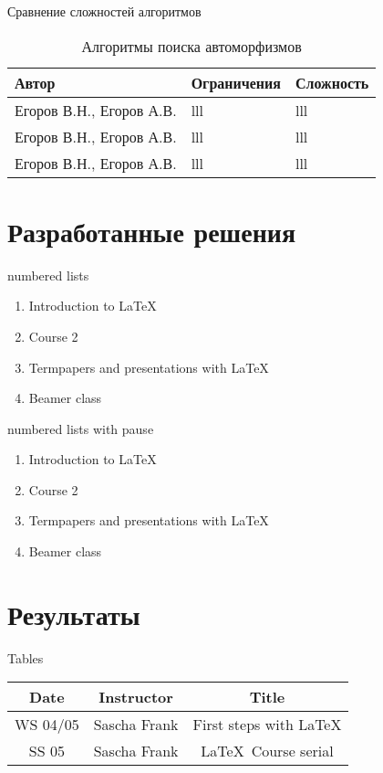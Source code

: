 \documentclass{beamer}
\begin{document}
\begin{frame}{Сравнение сложностей алгоритмов}

\begin{table}[h]
\centering
\begin{tabular}[t]{|l|l|l|}
\hline
\textbf{Автор} & \textbf{Ограничения} & \textbf{Сложность}\\
\hline
Егоров В.Н., Егоров А.В. & lll & lll\\
\hline
Егоров В.Н., Егоров А.В. & lll & lll\\
\hline
Егоров В.Н., Егоров А.В. & lll & lll\\
\hline
\end{tabular}
\caption{Алгоритмы поиска автоморфизмов}
\end{table}

\end{frame}


\section{Разработанные решения}
\begin{frame}{numbered lists}
\begin{enumerate}
\item Introduction to  \LaTeX  
\item Course 2 
\item Termpapers and presentations with \LaTeX 
\item Beamer class
\end{enumerate}
\end{frame}


\begin{frame}{numbered lists with pause}
\begin{enumerate}
\item Introduction to  \LaTeX \pause 
\item Course 2 \pause 
\item Termpapers and presentations with \LaTeX \pause 
\item Beamer class
\end{enumerate}
\end{frame}


\section{Результаты} 
\begin{frame}{Tables}
\begin{tabular}{|c|c|c|}
\hline
\textbf{Date} & \textbf{Instructor} & \textbf{Title} \\
\hline
WS 04/05 & Sascha Frank & First steps with  \LaTeX  \\
\hline
SS 05 & Sascha Frank & \LaTeX \ Course serial \\
\hline
\end{tabular}
\end{frame}
\end{document}
